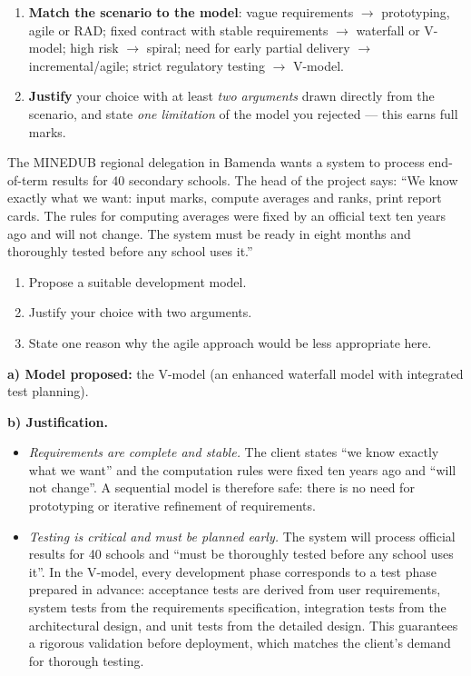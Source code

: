 \documentclass[11pt]{article}
\newcommand{\cle}[1]{{\popxbold\color{popdark}#1}}
\begin{document}
\begin{methode}
\begin{enumerate}
\begin{itemize}
\end{itemize}
\item \textbf{Match the scenario to the model}: vague requirements $\rightarrow$ prototyping, agile or RAD; fixed contract with stable requirements $\rightarrow$ waterfall or V-model; high risk $\rightarrow$ spiral; need for early partial delivery $\rightarrow$ incremental/agile; strict regulatory testing $\rightarrow$ V-model.
\item \textbf{Justify} your choice with at least \emph{two arguments} drawn directly from the scenario, and state \emph{one limitation} of the model you rejected — this earns full marks.
\end{enumerate}
\end{methode}

\begin{exoresolu}
The MINEDUB regional delegation in Bamenda wants a system to process end-of-term results for 40 secondary schools. The head of the project says: ``We know exactly what we want: input marks, compute averages and ranks, print report cards. The rules for computing averages were fixed by an official text ten years ago and will not change. The system must be ready in eight months and thoroughly tested before any school uses it.''
\begin{enumerate}
\item[a)] Propose a suitable development model.
\item[b)] Justify your choice with two arguments.
\item[c)] State one reason why the agile approach would be less appropriate here.
\end{enumerate}
\tcblower
\textbf{a) Model proposed:} the \cle{V-model} (an enhanced waterfall model with integrated test planning).

\textbf{b) Justification.}
\begin{itemize}
\item \emph{Requirements are complete and stable.} The client states ``we know exactly what we want'' and the computation rules were fixed ten years ago and ``will not change''. A sequential model is therefore safe: there is no need for prototyping or iterative refinement of requirements.
\item \emph{Testing is critical and must be planned early.} The system will process official results for 40 schools and ``must be thoroughly tested before any school uses it''. In the V-model, every development phase corresponds to a test phase prepared in advance: acceptance tests are derived from user requirements, system tests from the requirements specification, integration tests from the architectural design, and unit tests from the detailed design. This guarantees a rigorous validation before deployment, which matches the client's demand for thorough testing.
\end{itemize}


\end{exoresolu}
\end{document}
